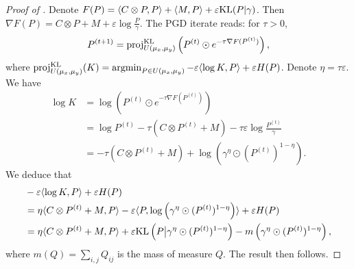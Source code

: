 \begin{proof}[Proof of ]
  Denote $F(P) = \langle C \otimes P, P \rangle + \langle M, P \rangle + \varepsilon \text{KL}(P | \gamma)$.
  Then $\nabla F(P) = C \otimes P + M + \varepsilon \log \frac{P}{\gamma}$.
  The PGD iterate reads: for $\tau > 0$,
  \begin{align}
    P^{(t+1)} = \text{proj}^{\text{KL}}_{U(\mu_x, \mu_y)}
    \left( P^{(t)} \odot e^{-\tau \nabla F(P^{(t)})} \right),
  \end{align}
  where $\text{proj}^{\text{KL}}_{U(\mu_x, \mu_y)}(K) =
  \operatorname*{argmin}_{P \in U(\mu_x, \mu_y)} - \varepsilon \langle \log K, P \rangle + \varepsilon H(P)$.
  Denote $\eta = \tau \varepsilon$. We have
  \begin{align}
    \log K &= \log \left( P^{(t)} \odot e^{-\tau \nabla F(P^{(t)})} \right) \\
    &= \log P^{(t)} - \tau (C \otimes P^{(t)} + M)  - \tau \varepsilon \log \frac{P^{(t)}}{\gamma} \\
    &= - \tau (C \otimes P^{(t)} + M) + \log \left( \gamma^{\eta} \odot (P^{(t)})^{1 - \eta} \right).
  \end{align}
  We deduce that
  \begin{align}
    &- \varepsilon \langle \log K, P \rangle + \varepsilon H(P) \\
    &= \eta \langle C \otimes P^{(t)} + M, P \rangle
    - \varepsilon \langle P, \log \left( \gamma^{\eta} \odot (P^{(t)})^{1 - \eta} \right) \rangle
    + \varepsilon H(P) \\
    &= \eta \langle C \otimes P^{(t)} + M, P \rangle +
    \varepsilon \text{KL} \left( P \big | \gamma^{\eta} \odot (P^{(t)})^{1 - \eta} \right)
    - m \left( \gamma^{\eta} \odot (P^{(t)})^{1 - \eta} \right),
  \end{align}
  where $m(Q) = \sum_{i,j} Q_{ij}$ is the mass of measure $Q$. The result then follows.
\end{proof}

